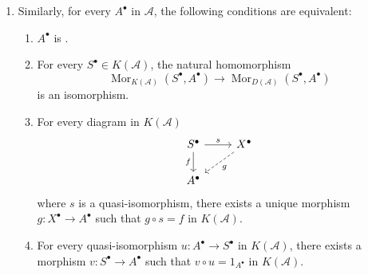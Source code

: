\begin{proposition}
\begin{enumerate}
        \item Similarly, for every $A^{\bullet}$ in $\mathcal{A}$, the following conditions are equivalent:
        \begin{enumerate}
            \item $A^{\bullet}$ is .
            \item For every $S^{\bullet} \in K(\mathcal{A})$, the natural homomorphism
            \[ \operatorname{Mor}_{K(\mathcal{A})}(S^{\bullet}, A^{\bullet}) \to \operatorname{Mor}_{D(\mathcal{A})}(S^{\bullet}, A^{\bullet}) \]
            is an isomorphism.
            \item For every diagram in $K(\mathcal{A})$
            \[ \begin{tikzcd}
                S^\bullet \arrow[r, "s"] \arrow[d, "f"'] & X^\bullet \arrow[ld, dashed, "g"] \\
                A^\bullet & 
            \end{tikzcd} \]
            where $s$ is a quasi-isomorphism, there exists a unique morphism $g: X^{\bullet} \to A^{\bullet}$ such that $g \circ s = f$ in $K(\mathcal{A})$.
            \item For every quasi-isomorphism $u: A^{\bullet} \to S^{\bullet}$ in $K(\mathcal{A})$, there exists a morphism $v: S^{\bullet} \to A^{\bullet}$ such that $v \circ u = 1_{A^{\bullet}}$ in $K(\mathcal{A})$.
        \end{enumerate}
    \end{enumerate}
\end{proposition}